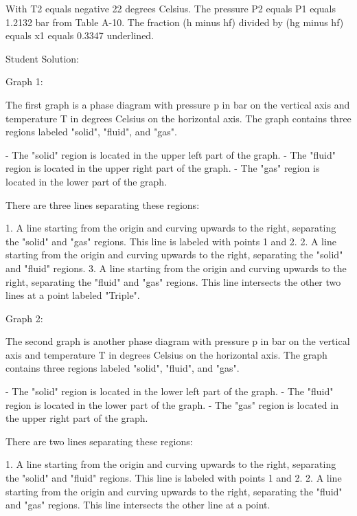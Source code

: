 With T2 equals negative 22 degrees Celsius. The pressure P2 equals P1 equals 1.2132 bar from Table A-10. The fraction (h minus hf) divided by (hg minus hf) equals x1 equals 0.3347 underlined.

Student Solution:

Graph 1:

The first graph is a phase diagram with pressure p in bar on the vertical axis and temperature T in degrees Celsius on the horizontal axis. The graph contains three regions labeled "solid", "fluid", and "gas". 

- The "solid" region is located in the upper left part of the graph.
- The "fluid" region is located in the upper right part of the graph.
- The "gas" region is located in the lower part of the graph.

There are three lines separating these regions:

1. A line starting from the origin and curving upwards to the right, separating the "solid" and "gas" regions. This line is labeled with points 1 and 2.
2. A line starting from the origin and curving upwards to the right, separating the "solid" and "fluid" regions.
3. A line starting from the origin and curving upwards to the right, separating the "fluid" and "gas" regions. This line intersects the other two lines at a point labeled "Triple".

Graph 2:

The second graph is another phase diagram with pressure p in bar on the vertical axis and temperature T in degrees Celsius on the horizontal axis. The graph contains three regions labeled "solid", "fluid", and "gas". 

- The "solid" region is located in the lower left part of the graph.
- The "fluid" region is located in the lower part of the graph.
- The "gas" region is located in the upper right part of the graph.

There are two lines separating these regions:

1. A line starting from the origin and curving upwards to the right, separating the "solid" and "fluid" regions. This line is labeled with points 1 and 2.
2. A line starting from the origin and curving upwards to the right, separating the "fluid" and "gas" regions. This line intersects the other line at a point.
